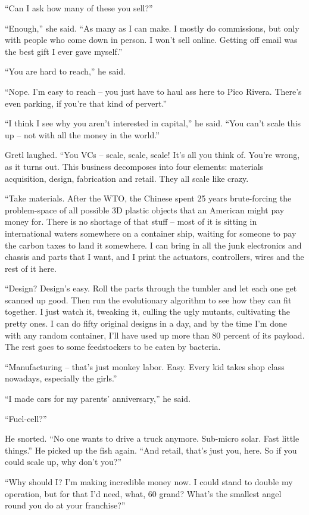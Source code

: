 “Can I ask how many of these you sell?”

“Enough,” she said. “As many as I can make. I mostly do 
commissions, but only with people who come down in person. I won't sell 
online. Getting off email was the best gift I ever gave myself.”

“You are hard to reach,” he said.

“Nope. I'm easy to reach -- you just have to haul ass here to Pico 
Rivera. There's even parking, if you're that kind of pervert.”

“I think I see why you aren't interested in capital,” he said. 
“You can't scale this up -- not with all the money in the world.”

Gretl laughed. “You VCs -- scale, scale, scale! It's all you think 
of. You're wrong, as it turns out. This business decomposes into four 
elements: materials acquisition, design, fabrication and retail. They 
all scale like crazy.

“Take materials. After the WTO, the Chinese spent 25 years 
brute-forcing the problem-space of all possible 3D plastic objects that 
an American might pay money for. There is no shortage of that stuff -- 
most of it is sitting in international waters somewhere on a container 
ship, waiting for someone to pay the carbon taxes to land it somewhere. 
I can bring in all the junk electronics and chassis and parts that I 
want, and I print the actuators, controllers, wires and the rest of it 
here.

“Design? Design's easy. Roll the parts through the tumbler and let 
each one get scanned up good. Then run the evolutionary algorithm to 
see how they can fit together. I just watch it, tweaking it, culling 
the ugly mutants, cultivating the pretty ones. I can do fifty original 
designs in a day, and by the time I'm done with any random container, 
I'll have used up more than 80 percent of its payload. The rest goes to 
some feedstockers to be eaten by bacteria.

“Manufacturing -- that's just monkey labor. Easy. Every kid takes 
shop class nowadays, especially the girls.”

“I made cars for my parents' anniversary,” he said.

“Fuel-cell?”

He snorted. “No one wants to drive a truck anymore. Sub-micro solar. 
Fast little things.” He picked up the fish again. “And retail, 
that's just you, here. So if you could scale up, why don't you?”

“Why should I? I'm making incredible money now. I could stand to 
double my operation, but for that I'd need, what, 60 grand? What's the 
smallest angel round you do at your franchise?”

